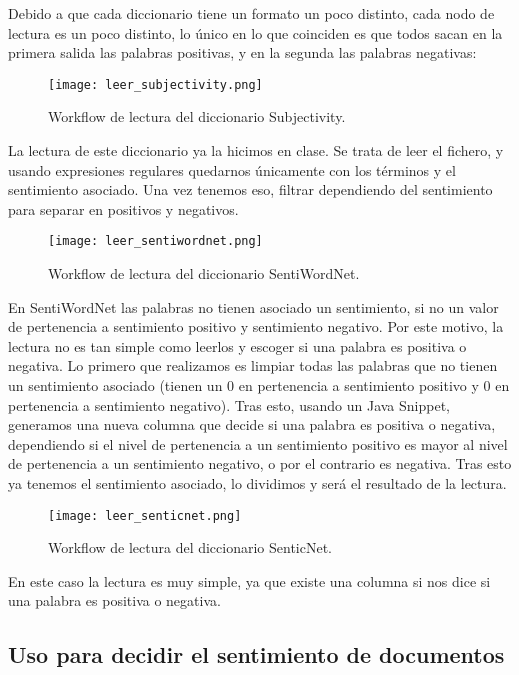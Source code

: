 Debido a que cada diccionario tiene un formato un poco distinto, cada nodo de lectura es un poco distinto, lo único en lo que coinciden es que todos sacan en la primera salida las palabras positivas, y en la segunda las palabras negativas:

\begin{figure}[H]
	\centering
	\texttt{[image: leer\_subjectivity.png]}
	\caption{Workflow de lectura del diccionario Subjectivity.}
	\label{fig:leer_subjectivity}
\end{figure}

La lectura de este diccionario ya la hicimos en clase. Se trata de leer el fichero, y usando expresiones regulares quedarnos únicamente con los términos y el sentimiento asociado. Una vez tenemos eso, filtrar dependiendo del sentimiento para separar en positivos y negativos.

\begin{figure}[H]
	\centering
	\texttt{[image: leer\_sentiwordnet.png]}
	\caption{Workflow de lectura del diccionario SentiWordNet.}
	\label{fig:leer_sentiwordnet}
\end{figure}

En SentiWordNet las palabras no tienen asociado un sentimiento, si no un valor de pertenencia a sentimiento positivo y sentimiento negativo. Por este motivo, la lectura no es tan simple como leerlos y escoger si una palabra es positiva o negativa. Lo primero que realizamos es limpiar todas las palabras que no tienen un sentimiento asociado (tienen un 0 en pertenencia a sentimiento positivo y 0 en pertenencia a sentimiento negativo). Tras esto, usando un Java Snippet, generamos una nueva columna que decide si una palabra es positiva o negativa, dependiendo si el nivel de pertenencia a un sentimiento positivo es mayor al nivel de pertenencia a un sentimiento negativo, o por el contrario es negativa. Tras esto ya tenemos el sentimiento asociado, lo dividimos y será el resultado de la lectura.

\begin{figure}[H]
	\centering
	\texttt{[image: leer\_senticnet.png]}
	\caption{Workflow de lectura del diccionario SenticNet.}
	\label{fig:leer_senticnet}
\end{figure}

En este caso la lectura es muy simple, ya que existe una columna si nos dice si una palabra es positiva o negativa.

\subsection{Uso para decidir el sentimiento de documentos}

